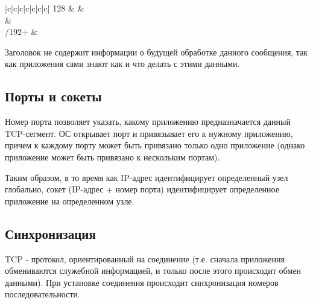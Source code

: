 \begin{table}[h]
\begin{tabular}{|c|c|c|c|c|c|c|}
		128 &                                                                                                             &  \\  &                                                                                                                                                                                                                                                                               \\ /192+ &                                                                                                                                                                                                                                                                              \\ \hline
	\end{tabular}
	\caption{Структура заголовка TCP}
\end{table}

Заголовок не содержит информации о будущей обработке данного сообщения, так как приложения сами знают как и что делать с этими данными.
\subsection{Порты и сокеты}
Номер порта позволяет указать, какому приложению предназначается данный TCP-сегмент. ОС открывает порт и привязывает его к нужному приложению, причем к каждому порту может быть привязано только одно приложение (однако приложение может быть привязано к нескольким портам).

Таким образом, в то время как IP-адрес идентифицирует определенный узел глобально, сокет (IP-адрес + номер порта) идентифицирует определенное приложение на определенном узле.
\subsection{Синхронизация}
TCP - протокол, ориентированный на соединение (т.е. сначала приложения обмениваются служебной информацией, и только после этого происходит обмен данными). При установке соединения происходит синхронизация номеров последовательности.

